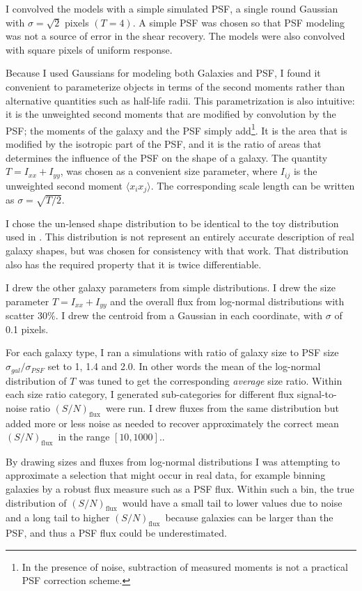 \documentclass[12pt,preprint]{aastex}
\newcommand{\fsn}{$(S/N)_{\textrm{flux}}$}
\begin{document}
I convolved the models with a simple simulated PSF, a single round Gaussian
with $\sigma = \sqrt{2}$ pixels $(T=4)$.  A simple PSF was chosen so that PSF
modeling was not a source of error in the shear recovery.  The models were also
convolved with square pixels of uniform response.

Because I used Gaussians for modeling both Galaxies and PSF, I found it
convenient to parameterize objects in terms of the second moments rather than
alternative quantities such as half-life radii.  This parametrization is also
intuitive: it is the unweighted second moments that are modified by convolution
by the PSF; the moments of the galaxy and the PSF simply add\footnote{In the
presence of noise, subtraction of measured moments is not a practical PSF
correction scheme.}.  It is the area that is modified by the isotropic part of
the PSF, and it is the ratio of areas that determines the influence of the PSF
on the shape of a galaxy.  The quantity $T = I_{xx} + I_{yy}$, was chosen as a
convenient size parameter, where $I_{ij}$ is the unweighted second moment
$\langle x_i x_j \rangle$.  The corresponding scale length can be written as
$\sigma = \sqrt{T/2}$.

I chose the un-lensed shape distribution to be identical to the toy
distribution used in \cite{ba14}.  This distribution is not represent an
entirely accurate description of real galaxy shapes, but was chosen for
consistency with that work.  That distribution also has the required property
that it is twice differentiable.

I drew the other galaxy parameters from simple distributions.  I drew the size
parameter $T=I_{xx} + I_{yy}$ and the overall flux from log-normal
distributions with scatter 30\%.  I drew the centroid from a Gaussian in each
coordinate, with $\sigma$ of 0.1 pixels.

For each galaxy type, I ran a simulations with ratio of galaxy size to PSF size
$\sigma_{gal}/\sigma_{PSF}$ set to 1, 1.4 and 2.0.  In other words the mean of
the log-normal distribution of $T$ was tuned to get the corresponding {\it
average} size ratio.  Within each size ratio category, I generated sub-categories for
different flux signal-to-noise ratio \fsn\ were run.  I drew fluxes from the
same distribution but added more or less noise as needed to recover approximately
the correct mean \fsn\ in the range $[10,1000]$..

By drawing sizes and fluxes from log-normal distributions I was attempting to
approximate a selection that might occur in real data, for example binning
galaxies by a robust flux measure such as a PSF flux.  Within such a bin, the
true distribution of \fsn\ would have a small tail to lower values due to noise
and a long tail to higher \fsn\ because galaxies can be larger than the
PSF, and thus a PSF flux could be underestimated.
\end{document}
